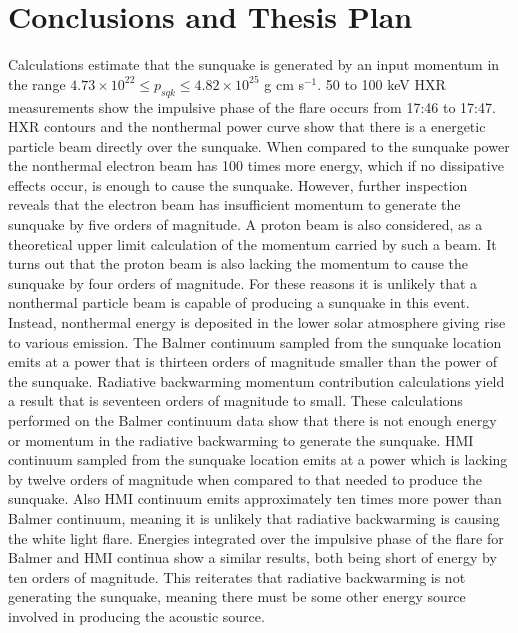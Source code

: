 \section{Conclusions and Thesis Plan}
Calculations estimate that the sunquake is generated by an input momentum in the range $4.73{\times}10^{22} \leq p_{sqk} \leq 4.82{\times}10^{25}$ g cm s$^{-1}$. 50 to 100 keV HXR measurements show the impulsive phase of the flare occurs from 17:46 to 17:47. HXR contours and the nonthermal power curve show that there is a energetic particle beam directly over the sunquake. When compared to the sunquake power the nonthermal electron beam has 100 times more energy, which if no dissipative effects occur, is enough to cause the sunquake. However, further inspection reveals that the electron beam has insufficient momentum to generate the sunquake by five orders of magnitude. A proton beam is also considered, as a theoretical upper limit calculation of the momentum carried by such a beam. It turns out that the proton beam is also lacking the momentum to cause the sunquake by four orders of magnitude. For these reasons it is unlikely that a nonthermal particle beam is capable of producing a sunquake in this event. Instead, nonthermal energy is deposited in the lower solar atmosphere giving rise to various emission. The Balmer continuum sampled from the sunquake location emits at a power that is thirteen orders of magnitude smaller than the power of the sunquake. Radiative backwarming momentum contribution calculations yield a result that is seventeen orders of magnitude to small. These calculations performed on the Balmer continuum data show that there is not enough energy or momentum in the radiative backwarming to generate the sunquake. HMI continuum sampled from the sunquake location emits at a power which is lacking by twelve orders of magnitude when compared to that needed to produce the sunquake. Also HMI continuum emits approximately ten times more power than Balmer continuum, meaning it is unlikely that radiative backwarming is causing the white light flare. Energies integrated over the impulsive phase of the flare for Balmer and HMI continua show a similar results, both being short of energy by ten orders of magnitude. This reiterates that radiative backwarming is not generating the sunquake, meaning there must be some other energy source involved in producing the acoustic source. \\
\noindent
